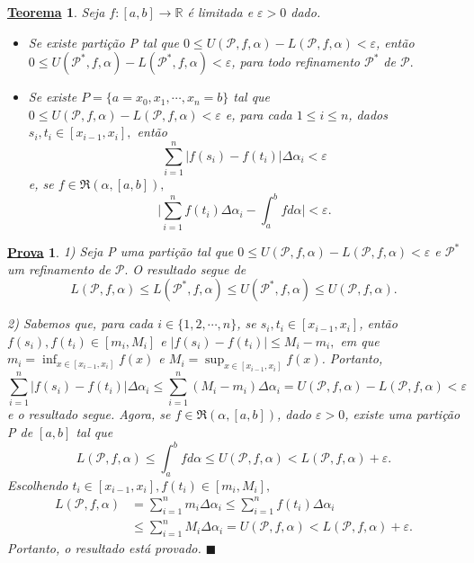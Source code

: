 \documentclass{article}
\newtheorem*{theorem*}{\underline{Teorema}}
\newtheorem*{proof*}{\underline{Prova}}
\renewcommand\qedsymbol{$\blacksquare$}
\begin{document}
\begin{theorem*}
  Seja \(f:[a, b]\rightarrow \mathbb{R}\) é limitada e \(\varepsilon  > 0\) dado.
 \begin{itemize}
   \item[1)] Se existe parti\c cão P tal que \(0\leq U(\mathcal{P}, f, \alpha ) - L(\mathcal{P}, f, \alpha )  < \varepsilon \), então
     \(0\leq U(\mathcal{P}^{*}, f, \alpha ) - L(\mathcal{P}^{*}, f, \alpha ) < \varepsilon \), para todo refinamento \(\mathcal{P}^{*}\) de \(\mathcal{P}.\)
   \item[2)] Se existe \(P = \{a = x_{0}, x_{1}, \cdots, x_{n} = b\}\) tal que \(0\leq U(\mathcal{P}, f, \alpha ) - L(\mathcal{P}, f, \alpha ) < \varepsilon \) e, para
     cada \(1\leq i\leq n\), dados \(s_{i}, t_{i}\in [x_{i-1}, x_{i}], \) então 
       \[
         \sum\limits_{i=1}^{n}|f(s_{i}) - f(t_{i})|\Delta \alpha_{i} < \varepsilon  
       \]
       e, se \(f\in \mathfrak{R}(\alpha , [a, b]),\) 
         \[
           \biggl|\sum\limits_{i=1}^{n}f(t_{i})\Delta \alpha_{i} - \int_{a}^{b}f d\alpha\biggr| < \varepsilon . 
         \]
 \end{itemize}
\end{theorem*}
\begin{proof*}
  1) Seja P uma parti\c cão tal que \(0\leq U(\mathcal{P}, f, \alpha ) - L(\mathcal{P}, f, \alpha ) < \varepsilon \) e 
 \(\mathcal{P}^{*}\) um refinamento de \(\mathcal{P}.\) O resultado segue de 
   \[
     L(\mathcal{P}, f, \alpha )\leq L(\mathcal{P}^{*}, f, \alpha )\leq U(\mathcal{P}^{*}, f, \alpha )\leq U(\mathcal{P}, f, \alpha ).
   \]

  2) Sabemos que, para cada \(i\in\{1, 2, \cdots, n\}\), se \(s_{i}, t_{i}\in [x_{i-1}, x_{i}]\), então
  \(f(s_{i}), f(t_{i})\in[m_{i}, M_{i}]\) e \(|f(s_{i})-f(t_{i})|\leq M_{i} - m_{i},\) em que 
  \(m_{i} = \inf_{x\in[x_{i-1}, x_{i}]}f(x)\) e \(M_{i}=\sup_{x\in[x_{i-1}, x_{i}]}f(x)\). Portanto, 
    \[
      \sum\limits_{i=1}^{n}|f(s_{i})-f(t_{i})|\Delta \alpha_{i}\leq \sum\limits_{i=1}^{n}(M_{i}-m_{i})\Delta \alpha_{i} = U(\mathcal{P}, f, \alpha )-L(\mathcal{P}, f, \alpha ) <\varepsilon 
    \]
    e o resultado segue. Agora, se \(f\in \mathfrak{R}(\alpha , [a, b])\), dado \(\varepsilon >0\), existe uma 
    parti\c cão P de \([a, b]\) tal que 
      \[
        L(\mathcal{P}, f, \alpha )\leq \int_{a}^{b}f d\alpha \leq U(\mathcal{P}, f, \alpha ) < L(\mathcal{P}, f, \alpha ) + \varepsilon .
      \]
      Escolhendo \(t_{i}\in[x_{i-1}, x_{i}], f(t_{i})\in[m_{i}, M_{i}],\) 
     \begin{align*}
       L(\mathcal{P}, f, \alpha ) &= \sum\limits_{i=1}^{n}m_{i}\Delta \alpha_{i}\leq \sum\limits_{i=1}^{n}f(t_{i})\Delta \alpha_{i}\\
                                  &\leq \sum\limits_{i=1}^{n}M_{i}\Delta\alpha_{i} = U(\mathcal{P}, f, \alpha ) < L(\mathcal{P}, f, \alpha ) + \varepsilon. 
     \end{align*}
     Portanto, o resultado está provado. \qedsymbol
\end{proof*}
\newpage
\end{document}
